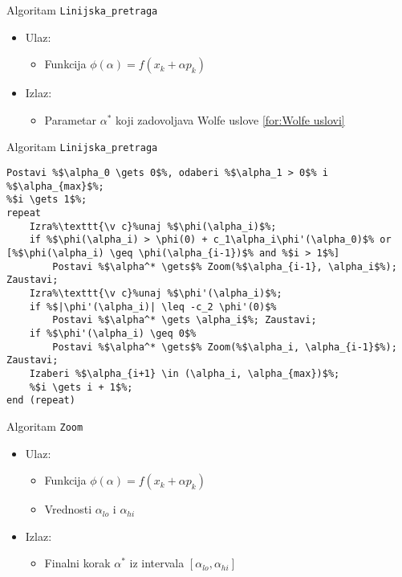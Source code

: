 \documentclass[serbian]{beamer}
\begin{document}
\begin{frame}{Algoritam \texttt{Linijska\_pretraga}}

\begin{itemize}
	\item Ulaz: 
	\begin{itemize}
		\item Funkcija $\phi(\alpha) = f(x_k + \alpha p_k)$
	\end{itemize}
	\item Izlaz: 
	\begin{itemize}
		\item Parametar $\alpha^*$ koji zadovoljava Wolfe uslove \ref{for:Wolfe uslovi}
	\end{itemize}
\end{itemize}

\end{frame}

\begin{frame}[fragile]{Algoritam \texttt{Linijska\_pretraga}}

\begin{lstlisting}
Postavi %$\alpha_0 \gets 0$%, odaberi %$\alpha_1 > 0$% i %$\alpha_{max}$%;
%$i \gets 1$%;
repeat
	Izra%\texttt{\v c}%unaj %$\phi(\alpha_i)$%;
	if %$\phi(\alpha_i) > \phi(0) + c_1\alpha_i\phi'(\alpha_0)$% or [%$\phi(\alpha_i) \geq \phi(\alpha_{i-1})$% and %$i > 1$%]
		Postavi %$\alpha^* \gets$% Zoom(%$\alpha_{i-1}, \alpha_i$%); Zaustavi;
	Izra%\texttt{\v c}%unaj %$\phi'(\alpha_i)$%;
	if %$|\phi'(\alpha_i)| \leq -c_2 \phi'(0)$%
		Postavi %$\alpha^* \gets \alpha_i$%; Zaustavi;
	if %$\phi'(\alpha_i) \geq 0$%
		Postavi %$\alpha^* \gets$% Zoom(%$\alpha_i, \alpha_{i-1}$%); Zaustavi;
	Izaberi %$\alpha_{i+1} \in (\alpha_i, \alpha_{max})$%;
	%$i \gets i + 1$%;
end (repeat)
\end{lstlisting}

\end{frame}

\begin{frame}{Algoritam \texttt{Zoom}}

\begin{itemize}
	\item Ulaz: 
	\begin{itemize}
		\item Funkcija $\phi(\alpha) = f(x_k + \alpha p_k)$
		\item Vrednosti $\alpha_{lo}$ i $\alpha_{hi}$
	\end{itemize}
	\item Izlaz: 
	\begin{itemize}
		\item Finalni korak $\alpha^*$ iz intervala $[\alpha_{lo}, \alpha_{hi}]$
	\end{itemize}
\end{itemize}

\end{frame}
\end{document}
